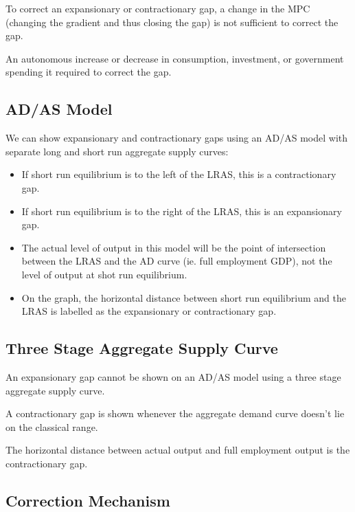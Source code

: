 \documentclass[a4paper,11pt]{article}
\begin{document}
To correct an expansionary or contractionary gap, a change in the MPC (changing
the gradient and thus closing the gap) is not sufficient to correct the gap.

An autonomous increase or decrease in consumption, investment, or government
spending it required to correct the gap.


\subsection{AD/AS Model}


We can show expansionary and contractionary gaps using an AD/AS model with
separate long and short run aggregate supply curves:

\begin{itemize}
\item If short run equilibrium is to the left of the LRAS, this is a
	contractionary gap.
\item If short run equilibrium is to the right of the LRAS, this is an
	expansionary gap.
\item The actual level of output in this model will be the point of intersection
	between the LRAS and the AD curve (ie. full employment GDP), not the level
	of output at shot run equilibrium.
\item On the graph, the horizontal distance between short run equilibrium and
	the LRAS is labelled as the expansionary or contractionary gap.
\end{itemize}


\subsection{Three Stage Aggregate Supply Curve}


An expansionary gap cannot be shown on an AD/AS model using a three stage
aggregate supply curve.

A contractionary gap is shown whenever the aggregate demand curve doesn't lie on
the classical range.

The horizontal distance between actual output and full employment output is the
contractionary gap.


\subsection{Correction Mechanism}
\end{document}
